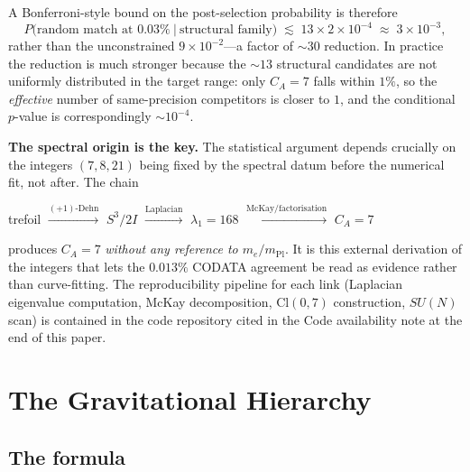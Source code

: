 \documentclass[11pt]{article}
\newcommand{\CA}{C_A}
\begin{document}
A Bonferroni-style bound on the post-selection probability is
therefore
\begin{equation*}
  P\bigl(\text{random match at } 0.03\%\ \big|\ \text{structural family}\bigr)
  \;\lesssim\; 13 \times 2 \times 10^{-4}
  \;\approx\; 3 \times 10^{-3},
\end{equation*}
rather than the unconstrained $9 \times 10^{-2}$---a factor of
$\sim 30$ reduction.  In practice the reduction is much
stronger because the $\sim 13$ structural candidates are not
uniformly distributed in the target range: only $\CA = 7$ falls
within $1\%$, so the \emph{effective} number of same-precision
competitors is closer to $1$, and the conditional $p$-value is
correspondingly $\sim\!10^{-4}$.

\medskip
\noindent\textbf{The spectral origin is the key.}
The statistical argument depends crucially on the integers
$(7, 8, 21)$ being fixed by the spectral datum before the
numerical fit, not after.  The chain
\begin{center}
trefoil $\xrightarrow{(+1)\text{-Dehn}}$ $S^3/2I$
$\xrightarrow{\text{Laplacian}}$ $\lambda_1 = 168$
$\xrightarrow{\text{McKay/factorisation}}$ $\CA = 7$
\end{center}
produces $\CA = 7$ \emph{without any reference to $m_e/m_\text{Pl}$}.
It is this external derivation of the integers that lets the
$0.013\%$ CODATA agreement be read as evidence rather than
curve-fitting.  The reproducibility pipeline for each link
(Laplacian eigenvalue computation, McKay decomposition,
Cl$(0,7)$ construction, $SU(N)$ scan) is contained in the code
repository cited in the Code availability note at the end of
this paper.


\section{The Gravitational Hierarchy}
\label{sec:hierarchy}

\subsection{The formula}
\end{document}
